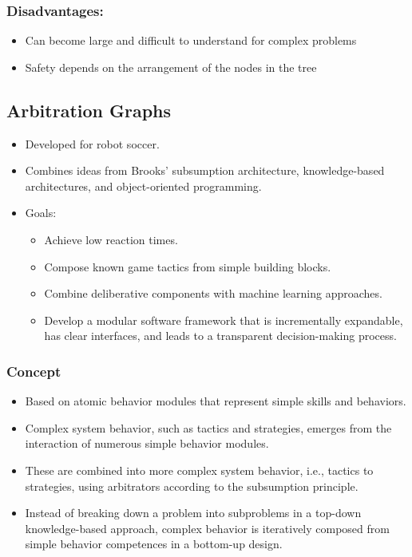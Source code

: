 \subsubsection*{Disadvantages:}
\begin{itemize}
    \item Can become large and difficult to understand for complex problems
    \item Safety depends on the arrangement of the nodes in the tree
\end{itemize}

\subsection*{Arbitration Graphs}

\begin{itemize}
    \item Developed for robot soccer.
    \item Combines ideas from Brooks' subsumption architecture, knowledge-based architectures, and object-oriented programming.
    \item Goals:
          \begin{itemize}
              \item Achieve low reaction times.
              \item Compose known game tactics from simple building blocks.
              \item Combine deliberative components with machine learning approaches.
              \item Develop a modular software framework that is incrementally expandable, has clear interfaces, and leads to a transparent decision-making process.
          \end{itemize}
\end{itemize}

\subsubsection*{Concept}
\begin{itemize}
    \item Based on atomic behavior modules that represent simple skills and behaviors.
    \item Complex system behavior, such as tactics and strategies, emerges from the interaction of numerous simple behavior modules.
    \item These are combined into more complex system behavior, i.e., tactics to strategies, using arbitrators according to the subsumption principle.
    \item Instead of breaking down a problem into subproblems in a top-down knowledge-based approach, complex behavior is iteratively composed from simple behavior competences in a bottom-up design.
\end{itemize}

